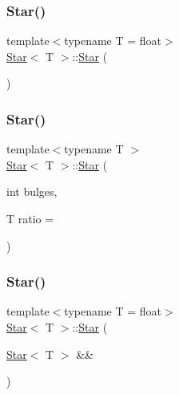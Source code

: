 \subsubsection{\texorpdfstring{Star()}{Star()}\hspace{0.1cm}{\footnotesize\ttfamily [1/4]}}
{\footnotesize\ttfamily template$<$typename T  = float$>$ \\
\mbox{\hyperlink{classStar}{Star}}$<$ T $>$\+::\mbox{\hyperlink{classStar}{Star}} (\begin{DoxyParamCaption}{ }\end{DoxyParamCaption})}

\mbox{\label{classStar_aa179936ed93e38e70992cb4f6e3cbff3}} 
\subsubsection{\texorpdfstring{Star()}{Star()}\hspace{0.1cm}{\footnotesize\ttfamily [2/4]}}
{\footnotesize\ttfamily template$<$typename T $>$ \\
\mbox{\hyperlink{classStar}{Star}}$<$ T $>$\+::\mbox{\hyperlink{classStar}{Star}} (\begin{DoxyParamCaption}\item[{int}]{bulges,  }\item[{T}]{ratio = {} }\end{DoxyParamCaption})}

\mbox{\label{classStar_af518471484341cad6b47ad42d4e637fe}} 
\subsubsection{\texorpdfstring{Star()}{Star()}\hspace{0.1cm}{\footnotesize\ttfamily [3/4]}}
{\footnotesize\ttfamily template$<$typename T  = float$>$ \\
\mbox{\hyperlink{classStar}{Star}}$<$ T $>$\+::\mbox{\hyperlink{classStar}{Star}} (\begin{DoxyParamCaption}\item[{\mbox{\hyperlink{classStar}{Star}}$<$ T $>$ \&\&}]{ }\end{DoxyParamCaption})\hspace{0.3cm}{\ttfamily [default]}}

